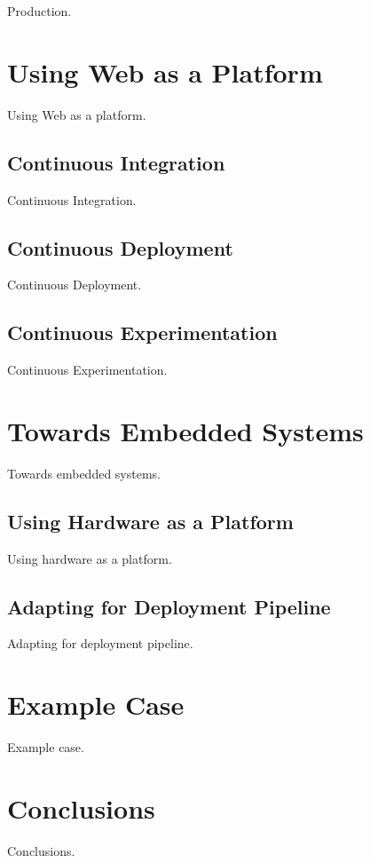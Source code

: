 \documentclass[english]{tktltiki2}
\begin{document}
Production.


\section{Using Web as a Platform}

Using Web as a platform.

\subsection{Continuous Integration}

Continuous Integration.

\subsection{Continuous Deployment}

Continuous Deployment.

\subsection{Continuous Experimentation}

Continuous Experimentation.


\section{Towards Embedded Systems}

Towards embedded systems.

\subsection{Using Hardware as a Platform}

Using hardware as a platform.

\subsection{Adapting for Deployment Pipeline}

Adapting for deployment pipeline.


\section{Example Case}

Example case.


\section{Conclusions}

Conclusions.




\end{document}
